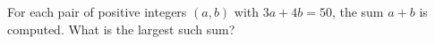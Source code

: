 For each pair of positive integers $(a,b)$ with $3a+4b=50$, the sum $a+b$ is computed. What is the largest such sum?
